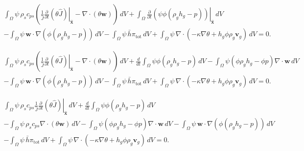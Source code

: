 \documentclass[11pt]{article}
\begin{document}
\begin{multline}
\int_{\Omega}
\psi\,\rho_{s} c_{ps} \left( \frac{1}{\widehat{J}} \left. \frac{\partial}{\partial t} \left( \theta \widehat{J} \right)\right|_{\widehat{\mathbf{x}}} - \nabla \cdot \left( \theta \mathbf{w} \right) \right)\,dV
+ \int_{\Omega}
 \left.\frac{\partial}{\partial t}\left(\psi \phi(\rho_g h_g - p) \right)\right|_{\widehat{\mathbf{x}}}\,dV
\\
- \int_{\Omega}
\psi\,\mathbf{w}\cdot\nabla\left( \phi(\rho_g h_g - p) \right)\,dV
- \int_{\Omega}
\psi\,\bar{h} \pi_{\mathrm{tot}}\,dV
+ \int_{\Omega}
\psi\,\nabla \cdot
\left(
 -\kappa\nabla \theta + h_g \phi \rho_{g} \mathbf{v}_{g}
\right)\,dV
= 0.
\end{multline}

\begin{multline}
\int_{\Omega}
\psi\,\rho_{s} c_{ps} \left( \frac{1}{\widehat{J}} \left. \frac{\partial}{\partial t} \left( \theta \widehat{J} \right)\right|_{\widehat{\mathbf{x}}} - \nabla \cdot \left( \theta \mathbf{w} \right) \right)\,dV
+ \frac{d}{dt} \int_{\Omega}
\psi \phi(\rho_g h_g - p) \,dV
- \int_{\Omega} \psi \left( \phi \rho_{g} h_{g} - \phi p \right) \nabla \cdot \mathbf{w} \,dV
\\
- \int_{\Omega}
\psi\,\mathbf{w}\cdot\nabla\left( \phi(\rho_g h_g - p) \right)\,dV
- \int_{\Omega}
\psi\,\bar{h} \pi_{\mathrm{tot}}\,dV
+ \int_{\Omega}
\psi\,\nabla \cdot
\left(
 -\kappa\nabla \theta + h_g \phi \rho_{g} \mathbf{v}_{g}
\right)\,dV
= 0.
\end{multline}

\begin{multline}
\int_{\Omega}
\psi\,\rho_{s} c_{ps} \frac{1}{\widehat{J}} \left. \frac{\partial}{\partial t} \left( \theta \widehat{J} \right)\right|_{\widehat{\mathbf{x}}} \,dV
+ \frac{d}{dt} \int_{\Omega}
\psi \phi(\rho_g h_g - p) \,dV
\\
- \int_{\Omega}
\psi\,\rho_{s} c_{ps} \nabla \cdot \left( \theta \mathbf{w} \right)\,dV
- \int_{\Omega} \psi \left( \phi \rho_{g} h_{g} - \phi p \right) \nabla \cdot \mathbf{w} \,dV
- \int_{\Omega}
\psi\,\mathbf{w}\cdot\nabla\left( \phi(\rho_g h_g - p) \right)\,dV
\\
- \int_{\Omega}
\psi\,\bar{h} \pi_{\mathrm{tot}}\,dV
+ \int_{\Omega}
\psi\,\nabla \cdot
\left(
 -\kappa\nabla \theta + h_g \phi \rho_{g} \mathbf{v}_{g}
\right)\,dV
= 0.
\end{multline}
\end{document}
